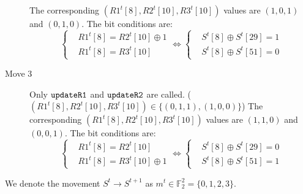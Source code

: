 \begin{description}
  The corresponding $(R1^t[8],R2^t[10],R3^t[10])$ values are $(1,0,1)$ and $(0,1,0)$.
  The bit conditions are:
  \begin{equation}\label{eq:Move2BitCondition}
    \left\{
    \begin{aligned}
    &R1^t[8]=R2^t[10]\oplus 1\\
    &R1^t[8]=R3^t[10]
    \end{aligned}
    \right.
    \Leftrightarrow
    \left\{
    \begin{aligned}
    &S^t[8]\oplus S^t[29]=1\\
    &S^t[8]\oplus S^t[51]=0
    \end{aligned}
    \right.
  \end{equation}
  \item[Move 3] Only $\tt{updateR1}$ and $\tt{updateR2}$ are called. ($(R1^t[8],R2^t[10],R3^t[10])\in \{(0,1,1),(1,0,0)\}$)
  The corresponding $(R1^t[8],R2^t[10],R3^t[10])$ values are $(1,1,0)$ and $(0,0,1)$.
  The bit conditions are:
  \begin{equation}\label{eq:Move3BitCondition}
    \left\{
    \begin{aligned}
    &R1^t[8]=R2^t[10]\\
    &R1^t[8]=R3^t[10]\oplus 1
    \end{aligned}
    \right.
    \Leftrightarrow
    \left\{
    \begin{aligned}
    &S^t[8]\oplus S^t[29]=0\\
    &S^t[8]\oplus S^t[51]=1
    \end{aligned}
    \right.
  \end{equation}
\end{description}
We denote the movement $S^t\rightarrow S^{t+1}$ as $m^t\in \mathbb{F}_2^2= \{0,1,2,3\}$. 

